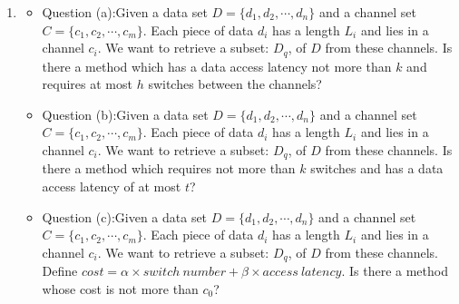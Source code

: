 \documentclass[12pt,a4paper]{article}
\makeatletter
\newtheorem*{solution}{Solution}
\theoremstyle{definition}
\renewenvironment{solution}[1][Solution] {\par\pushQED{\qed}\normalfont\topsep6\p@\@plus6\p@\relax\trivlist\item[\hskip\labelsep\bfseries#1\@addpunct{.}]\ignorespaces}{\popQED\endtrivlist\@endpefalse} \makeatother
\makeatother
\begin{document}
\begin{enumerate}
\begin{solution}
\begin{enumerate}
\begin{itemize}
		    	\item 
		    	    Question (a):Given a data set $D=\{d_1,d_2,\cdots,d_n\}$ and a channel set $C=\{c_1,c_2,\cdots,c_m\}$. Each piece of data $d_i$ has a length $L_i$ and lies in a channel $c_i$. We want to retrieve a subset: $D_q$, of $D$ from these channels. Is there a method which has a data access latency not more than $k$ and requires at most $h$ switches between the channels?
		    	\item 
		    	    Question (b):Given a data set $D=\{d_1,d_2,\cdots,d_n\}$ and a channel set $C=\{c_1,c_2,\cdots,c_m\}$. Each piece of data $d_i$ has a length $L_i$ and lies in a channel $c_i$. We want to retrieve a subset: $D_q$, of $D$ from these channels. Is there a method which requires not more than $k$ switches and has a data access latency of at most $t$?
		    	\item 
		    	    Question (c):Given a data set $D=\{d_1,d_2,\cdots,d_n\}$ and a channel set $C=\{c_1,c_2,\cdots,c_m\}$. Each piece of data $d_i$ has a length $L_i$ and lies in a channel $c_i$. We want to retrieve a subset: $D_q$, of $D$ from these channels. Define $cost=\alpha\times switch\ number+\beta\times access\ latency$. Is there a method whose cost is not more than $c_0$?
		    \end{itemize}
	\end{enumerate}
\end{solution}
\end{enumerate}

\end{document}
